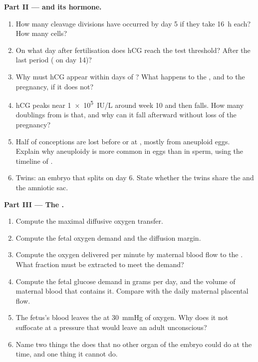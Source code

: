 \begin{problem}
\medskip
\noindent\textbf{Part II ---  and its hormone.}
\begin{enumerate}[resume]
  \item How many cleavage divisions have occurred by day 5 if they
        take \qty{16}{h} each? How many cells?
  \item On what day after fertilisation does hCG reach the test
        threshold? After the last period ( on day 14)?
  \item Why must hCG appear within days of ? What
        happens to the , and to the pregnancy, if it
        does not?
  \item hCG peaks near \qty{1e5}{IU/L} around week 10 and then falls.
        How many doublings from  is that, and why can it
        fall afterward without loss of the pregnancy?
  \item Half of conceptions are lost before or at ,
        mostly from aneuploid eggs. Explain why aneuploidy is more
        common in eggs than in sperm, using the timeline of
        .
  \item Twins: an embryo that splits on day 6. State whether the
        twins share the  and the amniotic sac.
\end{enumerate}

\medskip
\noindent\textbf{Part III --- The .}
\begin{enumerate}[resume]
  \item Compute the maximal diffusive oxygen transfer.
  \item Compute the fetal oxygen demand and the diffusion margin.
  \item Compute the oxygen delivered per minute by maternal blood
        flow to the . What fraction must be extracted to
        meet the demand?
  \item Compute the fetal glucose demand in grams per day, and the
        volume of maternal blood that contains it. Compare with the
        daily maternal placental flow.
  \item The fetus's blood leaves the  at \qty{30}{mmHg} of
        oxygen. Why does it not suffocate at a pressure that would
        leave an adult unconscious?
  \item Name two things the  does that no other organ of the
        embryo could do at the time, and one thing it cannot do.
\end{enumerate}


\end{problem}
